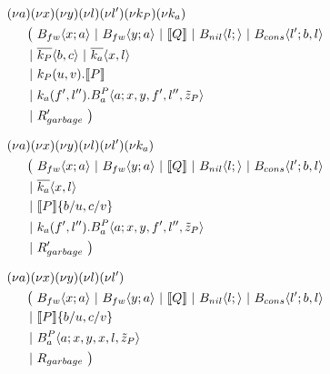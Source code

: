 \begin{align*}
  &\anew{a}{\anew{x}{\anew{y}{\anew{l}{\anew{l'}{\anew{k_P}{\anew{k_a}{ \\
    &\hspace{0.5cm}
    \begin{aligned}[t]
      \big(\ &\ains{B_{fw}}{x}{a}
      \apar   \ains{B_{fw}}{y}{a}
      \apar   \encMJtoAP{Q}
      \apar   \ains{B_{nil}}{l}{}
      \apar   \ains{B_{cons}}{l'}{b, l}
      \\
      \apar  &\asnd{k_P}{b,c}
      \apar   \asnd{k_a}{x,l}
      \\
      \apar  &\arcv{k_P}{u,v} . \encMJtoAP{P}
      \\
      \apar  &\arcv{k_a}{f',l''} . \ains{B_a^P}{a}{x, y, f', l'',\tilde{z}_P}
      \\
      \apar  &R_{garbage}'
      \ \big)
    \end{aligned}
  }}}}}}}
\end{align*}


\begin{align*}
  &\anew{a}{\anew{x}{\anew{y}{\anew{l}{\anew{l'}{\anew{k_a}{ \\
    &\hspace{0.5cm}
    \begin{aligned}[t]
      \big(\ &\ains{B_{fw}}{x}{a}
      \apar   \ains{B_{fw}}{y}{a}
      \apar   \encMJtoAP{Q}
      \apar   \ains{B_{nil}}{l}{}
      \apar   \ains{B_{cons}}{l'}{b, l}
      \\
      \apar  &\asnd{k_a}{x,l}
      \\
      \apar  &\encMJtoAP{P}\substitution{\subst{b}{u},\subst{c}{v}}
      \\
      \apar  &\arcv{k_a}{f',l''} . \ains{B_a^P}{a}{x, y, f', l'',\tilde{z}_P}
      \\
      \apar  &R_{garbage}'
      \ \big)
    \end{aligned}
  }}}}}}
\end{align*}


\begin{align*}
  &\anew{a}{\anew{x}{\anew{y}{\anew{l}{\anew{l'}{ \\
    &\hspace{0.5cm}
    \begin{aligned}[t]
      \big(\ &\ains{B_{fw}}{x}{a}
      \apar   \ains{B_{fw}}{y}{a}
      \apar   \encMJtoAP{Q}
      \apar   \ains{B_{nil}}{l}{}
      \apar   \ains{B_{cons}}{l'}{b, l}
      \\
      \apar  &\encMJtoAP{P}\substitution{\subst{b}{u},\subst{c}{v}}
      \\
      \apar  &\ains{B_a^P}{a}{x, y, x, l,\tilde{z}_P}
      \\
      \apar  &R_{garbage}
      \ \big)
    \end{aligned}
  }}}}}
\end{align*}

